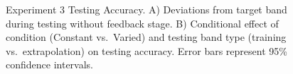 \documentclass[
  12pt,
  letterpaper,
]{article}
\begin{document}
\begin{figure}


\caption{\label{fig-e3-test-dev}Experiment 3 Testing Accuracy. A)
Deviations from target band during testing without feedback stage. B)
Conditional effect of condition (Constant vs.~Varied) and testing band
type (training vs.~extrapolation) on testing accuracy. Error bars
represent 95\% confidence intervals.}

\end{figure}%
\end{document}
